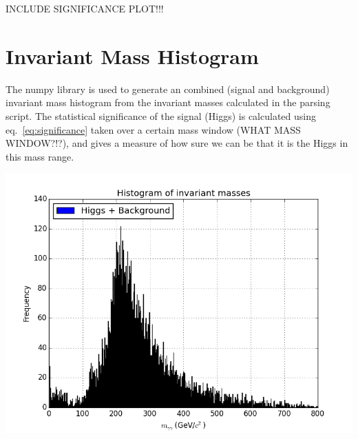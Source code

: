 \documentclass[11pt]{amsart}
\newenvironment{Figure}
  {\par\medskip\noindent\minipage{\linewidth}}
  {\endminipage\par\medskip}
\begin{document}
\begin{multicols}{2}
INCLUDE SIGNIFICANCE PLOT!!!


\section{Invariant Mass Histogram}

The numpy library is used to generate an combined (signal and background) invariant mass histogram from the invariant masses calculated in the parsing script. The statistical significance of the signal (Higgs) is calculated using eq.~\ref{eq:significance} taken over a certain mass window (WHAT MASS WINDOW?!?), and gives a measure of how sure we can be that it is the Higgs in this mass range.

\begin{Figure}
  \centering
  \includegraphics[width=\linewidth]{invmass}
  \label{fig:invmass}
\end{Figure}

\end{multicols}



\end{document}

